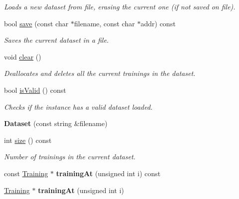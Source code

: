 \begin{DoxyCompactItemize}
\begin{DoxyCompactList}\small\item\em Loads a new dataset from file, erasing the current one (if not saved on file). \end{DoxyCompactList}\item 
bool \hyperlink{class_dataset_a97193aebac43df3a98852a8a675702ab}{save} (const char $\ast$filename, const char $\ast$addr) const 
\begin{DoxyCompactList}\small\item\em Saves the current dataset in a file. \end{DoxyCompactList}\item 
void \hyperlink{class_dataset_a67744c3bdc87acd2a8189b9c4fbcd192}{clear} ()
\begin{DoxyCompactList}\small\item\em Deallocates and deletes all the current trainings in the dataset. \end{DoxyCompactList}\item 
bool \hyperlink{class_dataset_a51c528f515d44baee36589e8de11af50}{is\-Valid} () const 
\begin{DoxyCompactList}\small\item\em Checks if the instance has a valid dataset loaded. \end{DoxyCompactList}\item 
\hypertarget{class_dataset_a299c3198f6325d0c627aa029ed24e2e5}{{\bfseries Dataset} (const string \&filename)}\label{class_dataset_a299c3198f6325d0c627aa029ed24e2e5}

\item 
\hypertarget{class_dataset_a19b9f5952a3839fd7f6a3cf02785249d}{int \hyperlink{class_dataset_a19b9f5952a3839fd7f6a3cf02785249d}{size} () const }\label{class_dataset_a19b9f5952a3839fd7f6a3cf02785249d}

\begin{DoxyCompactList}\small\item\em Number of trainings in the current dataset. \end{DoxyCompactList}\item 
\hypertarget{class_dataset_acce4206f736814c884672a642672de74}{const \hyperlink{class_training}{Training} $\ast$ {\bfseries training\-At} (unsigned int i) const }\label{class_dataset_acce4206f736814c884672a642672de74}

\item 
\hypertarget{class_dataset_a364c0454ce90684f0f375af8bb67772a}{\hyperlink{class_training}{Training} $\ast$ {\bfseries training\-At} (unsigned int i)}\label{class_dataset_a364c0454ce90684f0f375af8bb67772a}


\end{DoxyCompactItemize}
